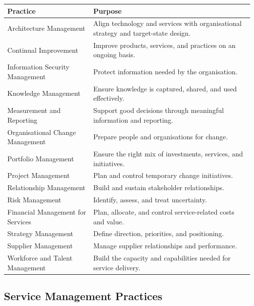 \documentclass[
  letterpaper,
  DIV=11,
  numbers=noendperiod]{scrartcl}
\begin{document}
\begin{longtable}[]{@{}
  >{\raggedright\arraybackslash}p{}
  >{\raggedright\arraybackslash}p{}@{}}
\toprule\noalign{}
\begin{minipage}[b]{\linewidth}\raggedright
Practice
\end{minipage} & \begin{minipage}[b]{\linewidth}\raggedright
Purpose
\end{minipage} \\
\midrule\noalign{}
\endhead
\bottomrule\noalign{}
\endlastfoot
Architecture Management & Align technology and services with
organisational strategy and target-state design. \\
Continual Improvement & Improve products, services, and practices on an
ongoing basis. \\
Information Security Management & Protect information needed by the
organisation. \\
Knowledge Management & Ensure knowledge is captured, shared, and used
effectively. \\
Measurement and Reporting & Support good decisions through meaningful
information and reporting. \\
Organisational Change Management & Prepare people and organisations for
change. \\
Portfolio Management & Ensure the right mix of investments, services,
and initiatives. \\
Project Management & Plan and control temporary change initiatives. \\
Relationship Management & Build and sustain stakeholder
relationships. \\
Risk Management & Identify, assess, and treat uncertainty. \\
Financial Management for Services & Plan, allocate, and control
service-related costs and value. \\
Strategy Management & Define direction, priorities, and positioning. \\
Supplier Management & Manage supplier relationships and performance. \\
Workforce and Talent Management & Build the capacity and capabilities
needed for service delivery. \\
\end{longtable}

\subsection{Service Management
Practices}\label{service-management-practices}
\end{document}
